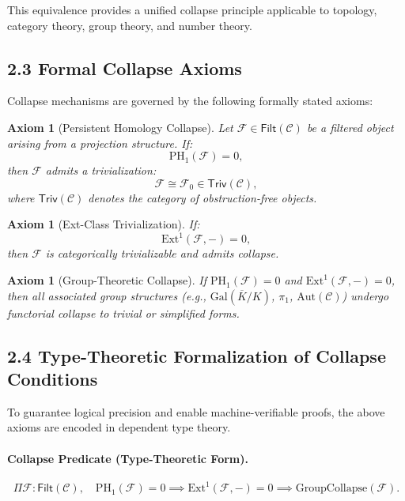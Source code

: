 \documentclass[11pt]{article}
\newtheorem{axiom}[theorem]{Axiom}
\begin{document}
This equivalence provides a unified collapse principle applicable to topology, category theory, group theory, and number theory.

\subsection*{2.3 Formal Collapse Axioms}

Collapse mechanisms are governed by the following formally stated axioms:

\begin{axiom}[Persistent Homology Collapse]
Let $\mathcal{F} \in \mathsf{Filt}(\mathcal{C})$ be a filtered object arising from a projection structure. If:
\[
\mathrm{PH}_1(\mathcal{F}) = 0,
\]
then $\mathcal{F}$ admits a trivialization:
\[
\mathcal{F} \cong \mathcal{F}_0 \in \mathsf{Triv}(\mathcal{C}),
\]
where $\mathsf{Triv}(\mathcal{C})$ denotes the category of obstruction-free objects.
\end{axiom}

\begin{axiom}[Ext-Class Trivialization]
If:
\[
\mathrm{Ext}^1(\mathcal{F}, -) = 0,
\]
then $\mathcal{F}$ is categorically trivializable and admits collapse.
\end{axiom}

\begin{axiom}[Group-Theoretic Collapse]
If $\mathrm{PH}_1(\mathcal{F}) = 0$ and $\mathrm{Ext}^1(\mathcal{F}, -) = 0$, then all associated group structures (e.g., $\mathrm{Gal}(\overline{K}/K)$, $\pi_1$, $\mathrm{Aut}(\mathcal{C})$) undergo functorial collapse to trivial or simplified forms.
\end{axiom}

\subsection*{2.4 Type-Theoretic Formalization of Collapse Conditions}

To guarantee logical precision and enable machine-verifiable proofs, the above axioms are encoded in dependent type theory.

\paragraph{Collapse Predicate (Type-Theoretic Form).}
\[
\Pi \mathcal{F} : \mathsf{Filt}(\mathcal{C}), \quad \mathrm{PH}_1(\mathcal{F}) = 0 \implies \mathrm{Ext}^1(\mathcal{F}, -) = 0 \implies \mathrm{GroupCollapse}(\mathcal{F}).
\]
\end{document}
